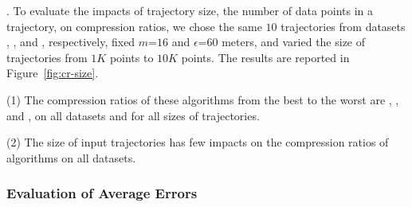 {.
To evaluate the impacts of trajectory size, \ie the number of data points in a trajectory, on compression ratios,
we chose the same {$10$} trajectories from datasets \sercar, \geolife, \mopsi and \pricar, respectively,
fixed {$m$=$16$} and $\epsilon$=$60$ meters, and varied the size  of trajectories from $1K$ points to $10K$ points.
%
The results are reported in Figure~\ref{fig:cr-size}.

\ni(1) The compression ratios of these algorithms from the best to the worst are \cista, \dps, \cist and \squishe, on all datasets and for all sizes of trajectories.

\ni(2) The size of input trajectories has few impacts on the compression ratios of \lsa algorithms on all datasets.





\subsubsection{Evaluation of Average Errors}



}
